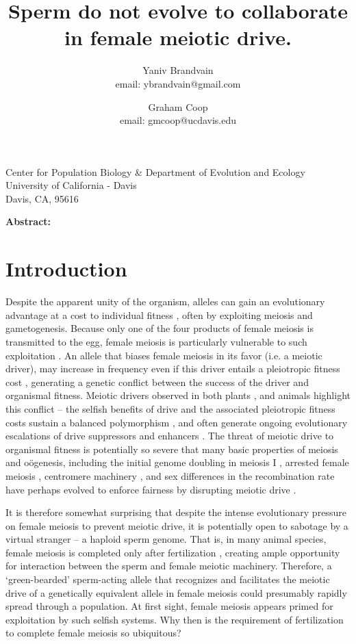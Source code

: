 \documentclass[12pt,letterpaper]{article}
\title{
Sperm do not evolve to collaborate in female meiotic drive. 
}
\author{Yaniv Brandvain \\ email: ybrandvain@gmail.com  \and Graham Coop \\ email: gmcoop@ucdavis.edu }
\date{}
\begin{document}
\maketitle
\begin{center}
Center for Population Biology \& Department of Evolution and Ecology \\ University of California - Davis \\ Davis, CA, 95616
\end{center}

{\bf Abstract:}
\newpage

\section*{Introduction}
Despite the apparent unity of the organism, alleles can
gain an evolutionary advantage at a cost to  individual fitness
\citep{Burt2006}, often by exploiting meiosis and gametogenesis.
Because only one of the four products of female meiosis is transmitted to the egg, female meiosis is particularly vulnerable to such exploitation \citep{Sandler1957,Pardo-ManuelDeVillena2001a}. 
An allele that biases female meiosis in its favor (i.e. a meiotic driver), may increase in frequency even if this driver entails a pleiotropic fitness cost \citep{Prout1973}, generating a genetic conflict between the success of the driver and organismal fitness.
Meiotic drivers observed in both plants
\citep{Buckler1999,Fishman2005,Fishman2008}, and animals
\citep{Agulnik1990,Wu2005,Pardo-ManuelDeVillena2001c} highlight this
conflict -- the selfish benefits of drive and the associated
pleiotropic fitness costs sustain a balanced polymorphism
\citep{Prout1973}, 
and often generate ongoing evolutionary escalations of drive suppressors and enhancers \citep{Dawe1996,Fishman2008}. 
The threat of meiotic drive to organismal fitness is potentially so
severe that many basic properties of
meiosis and o\"{o}genesis, including the initial genome doubling in
meiosis I \citep{Haig1991}, arrested female meiosis
\citep{Mira1998}, centromere machinery \citep{Malik2002a,Malik2009,Malik2009}, and sex differences in the recombination rate \citep{Haig2010,Brandvain2012} 
have perhaps evolved to enforce fairness by disrupting meiotic drive \citep{Rice2013}.

It is therefore somewhat surprising that despite the intense evolutionary pressure on female meiosis to prevent meiotic drive, 
it is potentially open to sabotage by a virtual stranger -- a haploid sperm genome.
That is, in many animal species, female meiosis is completed only after fertilization \citep{Masui_book}, 
creating ample opportunity for interaction between the sperm and female meiotic machinery. 
Therefore, a `green-bearded' \citep{Gardner2010} sperm-acting allele that recognizes and facilitates the meiotic drive of a genetically equivalent allele in female meiosis %
     could presumably rapidly spread through a population. 
At first sight, female meiosis appears primed for exploitation by such selfish systems.  
Why then is the requirement of fertilization to complete female meiosis so ubiquitous? 
\end{document}
